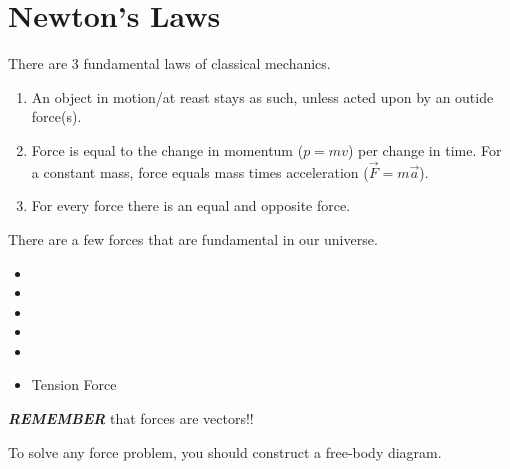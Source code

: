 \section{Newton's Laws} \label{sec:Newtons Laws}
There are 3 fundamental laws of classical mechanics.

\begin{enumerate}
  \item An object in motion/at reast stays as such, unless acted upon by an outide force(s).
  \item Force is equal to the change in momentum ($p=mv$) per change in time. For a constant mass, force equals mass times acceleration ($\vec{F} = m \vec{a}$).
  \item For every force there is an equal and opposite force.
\end{enumerate}
There are a few forces that are fundamental in our universe.

\begin{itemize}[noitemsep, nolistsep]
  \item {}
  \item {}
  \item {}
  \item {}
  \item {}
  \item Tension Force
\end{itemize}

\begin{remark*}
  \textbf{\emph{REMEMBER}} that forces are vectors!!
\end{remark*}

To solve any force problem, you should construct a free-body diagram.


